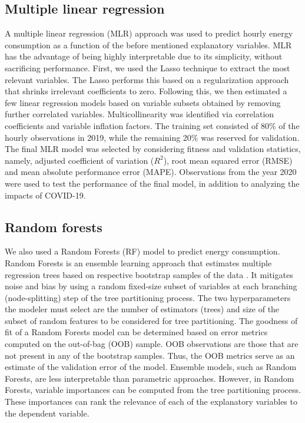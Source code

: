 \documentclass[times]{TRR}
\begin{document}
\subsection{Multiple linear regression}
A multiple linear regression (MLR) approach was used to predict hourly energy consumption as a function of the before mentioned explanatory variables. MLR has the advantage of being highly interpretable due to its simplicity, without sacrificing performance.  First, we used the Lasso technique to extract the most relevant variables. The Lasso performs this based on a regularization approach that shrinks irrelevant coefficients to zero. Following this, we then estimated a few linear regression models based on variable subsets obtained by removing further correlated variables. Multicollinearity was identified via correlation coefficients and variable inflation factors. 
The training set consisted of 80\% of the hourly observations in 2019, while the remaining 20\% was reserved for validation.
The final MLR model was selected by considering fitness and validation statistics, namely, adjusted coefficient of variation ($R^2$), root mean squared error (RMSE) and mean absolute performance error (MAPE).  Observations from the year 2020 were used to test the performance of the final model, in addition to analyzing the impacts of COVID-19.



\subsection{Random forests}
We also used a Random Forests (RF) model to predict energy consumption. Random Forests is an ensemble learning approach that estimates multiple regression trees based on respective bootstrap samples of the data \cite{ho1998random, arikan2018assessment, breiman2001random}.
It mitigates noise and bias by using a random fixed-size subset of variables at each branching (node-splitting) step of the tree partitioning process.
The two hyperparameters the modeler must select are the number of estimators (trees) and size of the subset of random features to be considered for tree partitioning. 
The goodness of fit of a Random Forests model can be determined based on error metrics computed on the out-of-bag (OOB) sample. OOB observations are those that are not present in any of the bootstrap samples. Thus, the OOB metrics serve  as an estimate of the validation error of the model. Ensemble models, such as Random Forests, are less interpretable than parametric approaches. However, in Random Forests, variable importances can be computed from the tree partitioning process. These importances can rank the relevance of each of the explanatory variables to the dependent variable.
\end{document}
